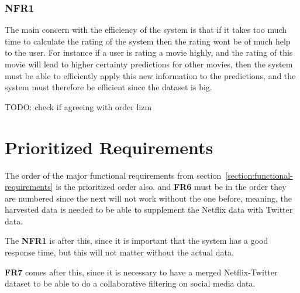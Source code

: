 \subsubsection{NFR1}
The main concern with the efficiency of the system is that if it takes too much time to calculate the rating of the system then the rating wont be of much help to the user. For instance if a user is rating a movie highly, and the rating of this movie will lead to higher certainty predictions for other movies, then the system must be able to efficiently apply this new information to the predictions, and the system must therefore be efficient since the dataset is big.


TODO: check if agreeing with order lizm
\section{Prioritized Requirements}
The order of the major functional requirements from section~\ref{section:functional-requirements} is the prioritized order also.  and \textbf{FR6} must be in the order they are numbered since the next will not work without the one before, meaning, the harvested data is needed to be able to supplement the Netflix data with Twitter data.

The \textbf{NFR1} is after this, since it is important that the system has a good response time, but this will not matter without the actual data.

\textbf{FR7} comes after this, since it is necessary to have a merged Netflix-Twitter dataset to be able to do a collaborative filtering on social media data.
